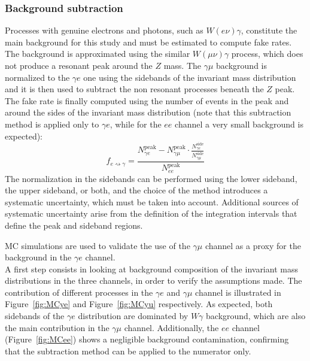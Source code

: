 \subsubsection{Background subtraction}
Processes with genuine electrons and photons, such as $W(e\nu)\gamma$, constitute the main background for this study and must be estimated to compute fake rates.  
The background is approximated using the similar $W(\mu\nu)\gamma$ process, which does not produce a resonant peak around the $Z$ mass. 
The $\gamma\mu$ background is normalized to the $\gamma e$ one using the sidebands of the invariant mass distribution and it is then used to subtract the non resonant processes beneath the $Z$ peak. 
The fake rate is finally computed using the number of events in the peak and around the sides of the invariant mass distribution (note that this subtraction method is applied only to $\gamma e$, while for the $ee$ channel a very small background is expected):
\[
f_{e\rightsquigarrow\gamma} = \frac{N_{\gamma e}^{\text{peak}} - N_{\gamma \mu}^{\text{peak}} \cdot \frac{N_{\gamma e}^{\text{side}}}{N_{\gamma \mu}^{\text{side}}}}{N_{ee}^{\text{peak}}}
\]
The normalization in the sidebands can be performed using the lower sideband, the upper sideband, or both, and the choice of the method introduces a systematic uncertainty, which must be taken into account.
Additional sources of systematic uncertainty arise from the definition of the integration intervals that define the peak and sideband regions.

MC simulations are used to validate the use of the $\gamma\mu$ channel as a proxy for the background in the $\gamma e$ channel. \\ 
A first step consists in looking at background composition of the invariant mass distributions in the three channels, in order to verify the assumptions made.  
The contribution of different processes in the $\gamma e$ and $\gamma\mu$ channel is illustrated in Figure~\ref{fig:MCye} and  Figure~\ref{fig:MCyu} respectively.
As expected, both sidebands of the $\gamma e$ distribution are dominated by $W\gamma$ background, which are also the main contribution in the $\gamma\mu$ channel.  
Additionally, the $ee$ channel (Figure~\ref{fig:MCee}) shows a negligible background contamination, confirming that the subtraction method can be applied to the numerator only. 


